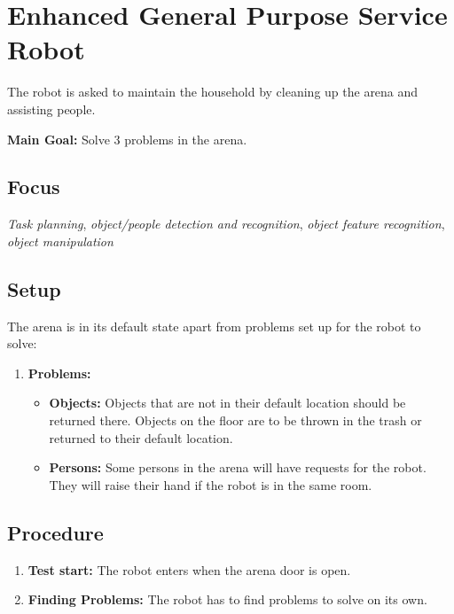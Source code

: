 \section{Enhanced General Purpose Service Robot}
\label{test:egpsr}
The robot is asked to maintain the household by cleaning up the arena and assisting people.


\noindent \textbf{Main Goal:} Solve 3 problems in the arena.\\


\subsection*{Focus}
\emph{Task planning}, \emph{object/people detection and recognition}, \emph{object feature recognition}, \emph{object manipulation}


\subsection*{Setup}
The arena is in its default state apart from problems set up for the robot to solve:
\begin{enumerate}
    \item \textbf{Problems:}
		\begin{itemize}
			\item \textbf{Objects:} Objects that are not in their default location should be returned there. Objects on the floor are to be thrown in the trash or returned to their default location.
			\item \textbf{Persons:} Some persons in the arena will have requests for the robot. They will raise their hand if the robot is in the same room.
		\end{itemize}
\end{enumerate}


\subsection*{Procedure}
\begin{enumerate}[nosep]
	\item \textbf{Test start:} The robot enters when the arena door is open.
	\item \textbf{Finding Problems:} The robot has to find problems to solve on its own.
\end{enumerate}


